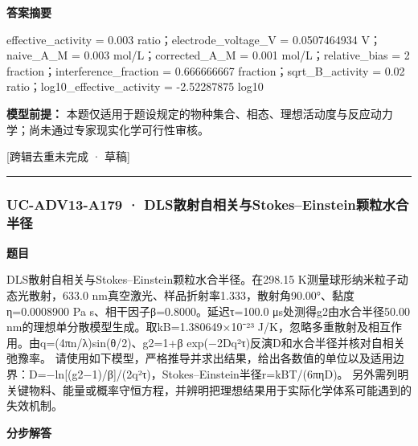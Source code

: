 \documentclass[UTF8,11pt,a4paper]{ctexart}
\begin{document}
\noindent\textbf{答案摘要}\par
effective\_activity = 0.003 ratio；electrode\_voltage\_V = 0.0507464934 V；naive\_A\_M = 0.003 mol/L；corrected\_A\_M = 0.001 mol/L；relative\_bias = 2 fraction；interference\_fraction = 0.666666667 fraction；sqrt\_B\_activity = 0.02 ratio；log10\_effective\_activity = -2.52287875 log10\par
\noindent\textbf{模型前提：}
本题仅适用于题设规定的物种集合、相态、理想活动度与反应动力学；尚未通过专家现实化学可行性审核。\par
\noindent\textcolor{red!65!black}{[跨辑去重未完成 · 草稿]} \par
\medskip\hrule\medskip
{}
\subsubsection*{UC-ADV13-A179 · DLS散射自相关与Stokes–Einstein颗粒水合半径}
\noindent\textbf{题目}\par
DLS散射自相关与Stokes–Einstein颗粒水合半径。在298.15 K测量球形纳米粒子动态光散射，633.0 nm真空激光、样品折射率1.333，散射角90.00°、黏度η=0.0008900 Pa s、相干因子β=0.8000。延迟τ=100.0 μs处测得g2由水合半径50.00 nm的理想单分散模型生成。取kB=1.380649×10⁻²³ J/K，忽略多重散射及相互作用。由q=(4πn/λ)sin(θ/2)、g2=1+β exp(−2Dq²τ)反演D和水合半径并核对自相关弛豫率。 请使用如下模型，严格推导并求出结果，给出各数值的单位以及适用边界：D=−ln[(g2−1)/β]/(2q²τ)，Stokes–Einstein半径r=kBT/(6πηD)。 另外需列明关键物料、能量或概率守恒方程，并辨明把理想结果用于实际化学体系可能遇到的失效机制。\par
\medskip\noindent\textbf{分步解答}
\end{document}
